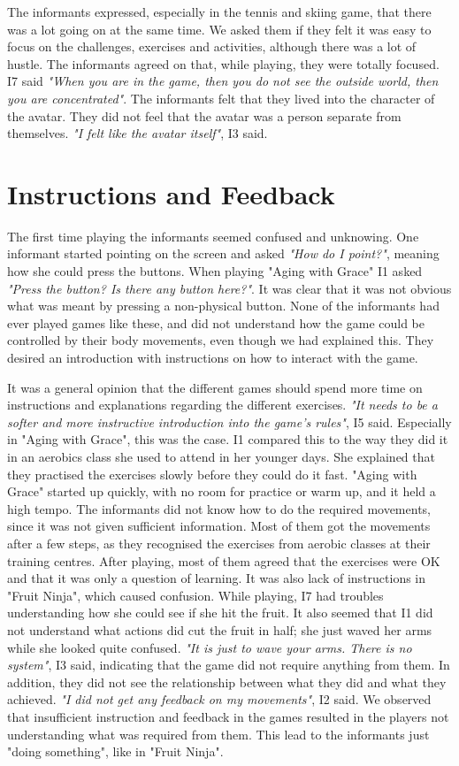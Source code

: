 The informants expressed, especially in the tennis and skiing game, that there was a lot going on at the same time. We asked them if they felt it was easy to focus on the challenges, exercises and activities, although there was a lot of hustle. The informants agreed on that, while playing, they were totally focused. I7 said \emph{"When you are in the game, then you do not see the outside world, then you are concentrated"}. The informants felt that they lived into the character of the avatar. They did not feel that the avatar was a person separate from themselves. \emph{"I felt like the avatar itself"}, I3 said. 

\section{Instructions and Feedback}
The first time playing the informants seemed confused and unknowing. One informant started pointing on the screen and asked \emph{"How do I point?"}, meaning how she could press the buttons. When playing "Aging with Grace" I1 asked \emph{"Press the button? Is there any button here?"}. It was clear that it was not obvious what was meant by pressing a non-physical button. None of the informants had ever played games like these, and did not understand how the game could be controlled by their body movements, even though we had explained this. They desired an introduction with instructions on how to interact with the game.

It was a general opinion that the different games should spend more time on instructions and explanations regarding the different exercises. \emph{"It needs to be a softer and more instructive introduction into the game's rules"}, I5 said. Especially in "Aging with Grace", this was the case. I1 compared this to the way they did it in an aerobics class she used to attend in her younger days. She explained that they practised the exercises slowly before they could do it fast. "Aging with Grace" started up quickly, with no room for practice or warm up, and it held a high tempo. The informants did not know how to do the required movements, since it was not given sufficient information. Most of them got the movements after a few steps, as they recognised the exercises from aerobic classes at their training centres. After playing, most of them agreed that the exercises were OK and that it was only a question of learning. It was also lack of instructions in "Fruit Ninja", which caused confusion. While playing, I7 had troubles understanding how she could see if she hit the fruit. It also seemed that I1 did not understand what actions did cut the fruit in half; she just waved her arms while she looked quite confused. \emph{"It is just to wave your arms. There is no system"}, I3 said, indicating that the game did not require anything from them. In addition, they did not see the relationship between what they did and what they achieved. \emph{"I did not get any feedback on my movements"}, I2 said. We observed that insufficient instruction and feedback in the games resulted in the players not understanding what was required from them. This lead to the informants just "doing something", like in "Fruit Ninja". 

